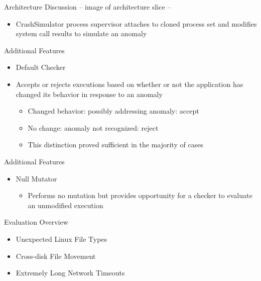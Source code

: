 \documentclass[pdf]{beamer}
\begin{document}
\begin{frame}{Architecture Discussion}
  -- image of architecture slice --
  \begin{itemize}
    \item{CrashSimulator process supervisor attaches to cloned process set
      and modifies system call results to simulate an anomaly}
  \end{itemize}
\end{frame}


\begin{frame}{Additional Features}
  \begin{itemize}
    \item{Default Checker}
    \item{Accepts or rejects executions based on whether or not the
      application has changed its behavior in response to an anomaly}
      \begin{itemize}
        \item{Changed behavior: possibly addressing anomaly: accept}
        \item{No change: anomaly not recognized: reject}
        \item{This distinction proved sufficient in the majority of cases}
      \end{itemize}
  \end{itemize}
\end{frame}


\begin{frame}{Additional Features}
  \begin{itemize}
    \item{Null Mutator}
      \begin{itemize}
        \item{Performs no mutation but provides opportunity for a checker to
          evaluate an unmodified execution}
      \end{itemize}
  \end{itemize}
\end{frame}


\begin{frame}{Evaluation Overview}
  \begin{itemize}
    \item{Unexpected Linux File Types}
    \item{Cross-disk File Movement}
    \item{Extremely Long Network Timeouts}
  \end{itemize}
\end{frame}
\end{document}
